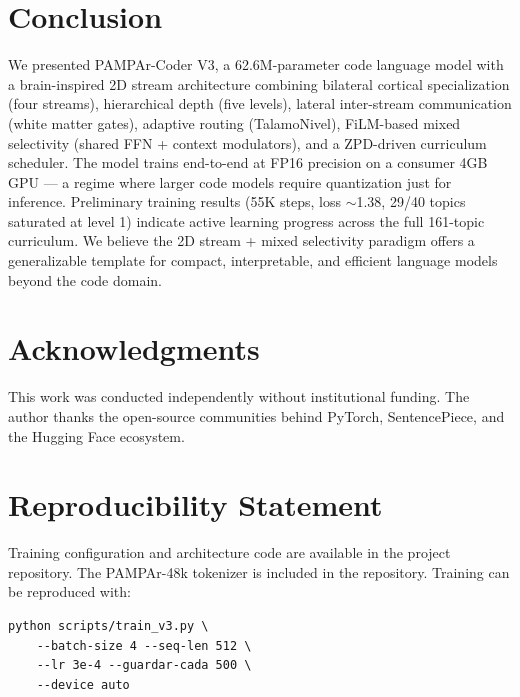 \documentclass[11pt,a4paper]{article}
\begin{document}
\section{Conclusion}
\label{sec:conclusion}

We presented PAMPAr-Coder V3, a 62.6M-parameter code language model with a
brain-inspired 2D stream architecture combining bilateral cortical
specialization (four streams), hierarchical depth (five levels), lateral
inter-stream communication (white matter gates), adaptive routing (TalamoNivel),
FiLM-based mixed selectivity (shared FFN + context modulators), and a
ZPD-driven curriculum scheduler.  The model trains end-to-end at FP16
precision on a consumer 4GB GPU — a regime where larger code models require
quantization just for inference.  Preliminary training results (55K steps,
loss $\sim$1.38, 29/40 topics saturated at level 1) indicate active learning
progress across the full 161-topic curriculum.  We believe the 2D stream +
mixed selectivity paradigm offers a generalizable template for compact,
interpretable, and efficient language models beyond the code domain.

\section*{Acknowledgments}

This work was conducted independently without institutional funding.
The author thanks the open-source communities behind PyTorch, SentencePiece,
and the Hugging Face ecosystem.

\section*{Reproducibility Statement}

Training configuration and architecture code are available in the project
repository.  The PAMPAr-48k tokenizer is included in the repository.
Training can be reproduced with:

\begin{verbatim}
python scripts/train_v3.py \
    --batch-size 4 --seq-len 512 \
    --lr 3e-4 --guardar-cada 500 \
    --device auto
\end{verbatim}
\end{document}

